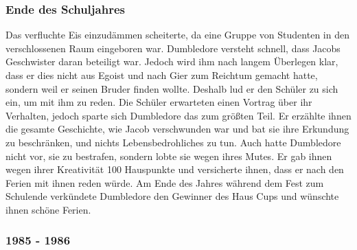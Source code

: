 \documentclass[a4paper, 10pt]{article}
\begin{document}
\subsubsection*{Ende des Schuljahres}
Das verfluchte Eis einzudämmen scheiterte, da eine Gruppe von Studenten in den verschlossenen Raum eingeboren war. Dumbledore versteht schnell, dass Jacobs Geschwister daran beteiligt war. Jedoch wird ihm nach langem Überlegen klar, dass er dies nicht aus Egoist und nach Gier zum Reichtum gemacht hatte, sondern weil er seinen Bruder finden wollte. Deshalb lud er den Schüler zu sich ein, um mit ihm zu reden. Die Schüler erwarteten einen Vortrag über ihr Verhalten, jedoch sparte sich Dumbledore das zum größten Teil. Er erzählte ihnen die gesamte Geschichte, wie Jacob verschwunden war und bat sie ihre Erkundung zu beschränken, und nichts Lebensbedrohliches zu tun. Auch hatte Dumbledore nicht vor, sie zu bestrafen, sondern lobte sie wegen ihres Mutes. Er gab ihnen wegen ihrer Kreativität 100 Hauspunkte und versicherte ihnen, dass er nach den Ferien mit ihnen reden würde. Am Ende des Jahres während dem Fest zum Schulende verkündete Dumbledore den Gewinner des Haus Cups und wünschte ihnen schöne Ferien.

\subsubsection*{1985 - 1986}
\end{document}
